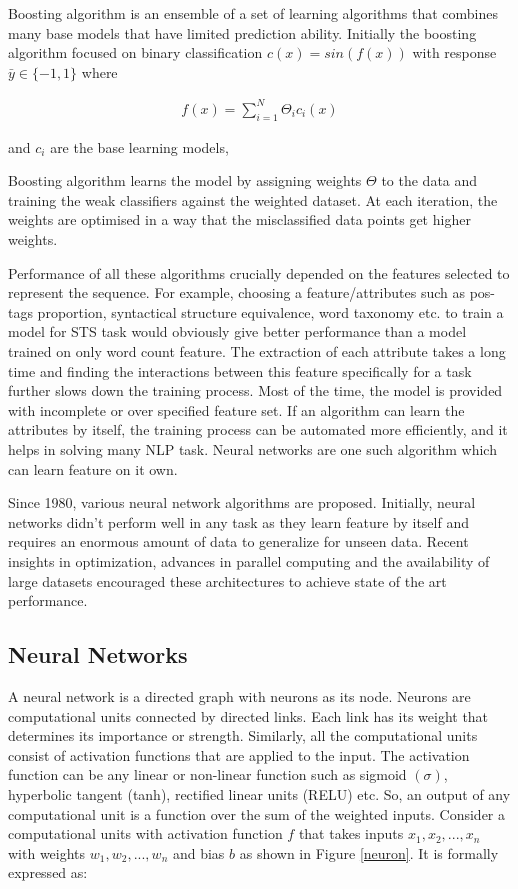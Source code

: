 \documentclass[12pt]{report} %
\begin{document}
Boosting algorithm is an ensemble of a set of learning algorithms that combines many base models that have limited prediction ability. Initially the boosting algorithm focused on binary classification $c(x)= sin(f(x))$ with response $\bar{y} \in \{-1,1\} $ where  

\begin{align}
f(x) =     \sum_{i=1}^{N} \varTheta_{i} c_{i}(x)
\end{align}

and $c_{i}$ are the base learning models,

Boosting algorithm learns the model by assigning weights $\varTheta$ to the data and training the weak classifiers against the weighted dataset. At each iteration, the weights are optimised in a way that the misclassified data points get higher weights.

Performance of all these algorithms crucially depended on the features selected to represent the sequence. For example, choosing a feature/attributes such as pos-tags proportion, syntactical structure equivalence, word taxonomy etc. to train a model for STS task would obviously give better performance than a model trained on only word count feature. The extraction of each attribute takes a long time and finding the interactions between this feature specifically for a task further slows down the training process. Most of the time, the model is provided with incomplete or over specified feature set. If an algorithm can learn the attributes by itself, the training process can be automated more efficiently, and it helps in solving many NLP task. Neural networks are one such algorithm which can learn feature on it own.

Since 1980, various neural network algorithms are proposed. Initially, neural networks didn't perform well in any task as they learn feature by itself and requires an enormous amount of data to generalize for unseen data. Recent insights in optimization, advances in parallel computing and the availability of large datasets encouraged these architectures to achieve state of the art performance. 


\subsection{Neural Networks}

A neural network is a directed graph with neurons as its node. Neurons are computational units connected by directed links. Each link has its weight that determines its importance or strength. Similarly, all the computational units consist of activation functions that are applied to the input. The activation function can be any linear or non-linear function such as sigmoid $(\sigma)$, hyperbolic tangent (tanh), rectified linear units (RELU) etc. So, an output of any computational unit is a function over the sum of the weighted inputs. Consider a computational units with activation function $f$ that takes inputs $x_{1},x_{2},...,x_{n}$ with weights $w_{1},w_{2},...,w_{n}$ and bias $b$ as shown in Figure \ref{neuron}. It is formally expressed as:
\end{document}
